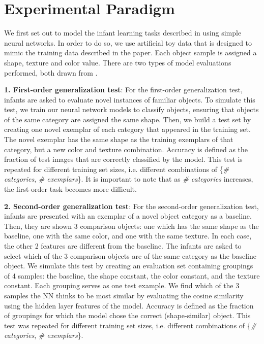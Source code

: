 \section{Experimental Paradigm}
\label{sec:experimental_paradigm}
We first set out to model the infant learning tasks described in \cite{Smith2002} using
simple neural networks. In order to do so, we use artificial toy data that is designed
to mimic the training data described in the paper. Each object sample is assigned a shape,
texture and color value. There are two types of model evaluations performed, both drawn from
\cite{Smith2002}.

{\bf1. First-order generalization test}: For the first-order generalization test, infants
are asked to evaluate novel instances of familiar objects. To simulate this test, we train
our neural network models to classify objects, ensuring that objects of the same category
are assigned the same shape. Then, we build a test set by creating one novel exemplar of
each category that appeared in the training set. The novel exemplar has the same
shape as the training exemplars of that category, but a new color and texture combination.
Accuracy is defined as the fraction of test images that are correctly classified by the model.
This test is repeated for different training set sizes, i.e. different combinations of
\{\textit{\# categories}, \textit{\# exemplars}\}. It is important to note that as
\textit{\# categories} increases, the first-order task becomes more difficult.

{\bf2. Second-order generalization test}: For the second-order generalization test, infants
are presented with an exemplar of a novel object category as a baseline. Then, they are
shown 3 comparison objects: one which has the same shape as the baseline, one with the same
color, and one with the same texture. In each case, the other 2 features are different from
the baseline. The infants are asked to select which of the 3 comparison objects are of the
same category as the baseline object. We simulate this test by creating an evaluation set
containing groupings of 4 samples: the baseline, the shape constant, the color constant, and
the texture constant. Each grouping serves as one test example. We find which of the 3
samples the NN thinks to be most similar by evaluating the cosine similarity using the
hidden layer features of the model. Accuracy is defined as the fraction of groupings for
which the model chose the correct (shape-similar) object. This test was repeated for
different training set sizes, i.e. different combinations of \{\textit{\# categories},
\textit{\# exemplars}\}.

